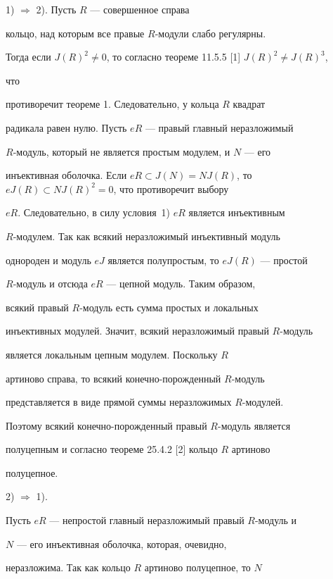 \begin{pf} 


1) $\Rightarrow$ 2). Пусть $R$ --- совершенное справа 


кольцо, над которым все правые $R$-модули слабо регулярны. 


Тогда если $J(R)^2\ne0$, то согласно теореме 11.5.5 [1] $J(R)^2\ne J(R)^3$, 


что 


противоречит теореме 1. Следовательно, у кольца $R$ квадрат 


радикала равен нулю. Пусть $eR$ --- правый главный неразложимый 


$R$-модуль, который не является простым модулем, и $N$ --- его 


инъективная оболочка. Если $eR\subset J(N)=NJ(R)$, то $eJ(R)\subset 


NJ(R)^2=0$, что противоречит выбору 


$eR$. Следовательно, в силу условия~1) $eR$ является инъективным 


$R$-модулем. Так как всякий неразложимый инъективный модуль 


однороден и модуль $eJ$ является полупростым, то $eJ(R)$ --- простой 


$R$-модуль и отсюда $eR$ --- цепной модуль. Таким образом, 


всякий правый $R$-модуль есть сумма простых и локальных 


инъективных модулей. Значит, всякий неразложимый правый $R$-модуль 


является локальным цепным модулем. Поскольку $R$ 


артиново справа, то всякий конечно-порожденный $R$-модуль 


представляется в виде прямой суммы неразложимых $R$-модулей. 


Поэтому всякий конечно-порожденный правый $R$-модуль является 


полуцепным и согласно теореме 25.4.2 [2] кольцо $R$ артиново 


полуцепное. 


 


2) $\Rightarrow$ 1). 


Пусть $eR$ --- непростой главный неразложимый правый $R$-модуль и 


$N$ --- его инъективная оболочка, которая, очевидно, 


неразложима. Так как кольцо $R$ артиново полуцепное, то $N$ 



\end{pf}
